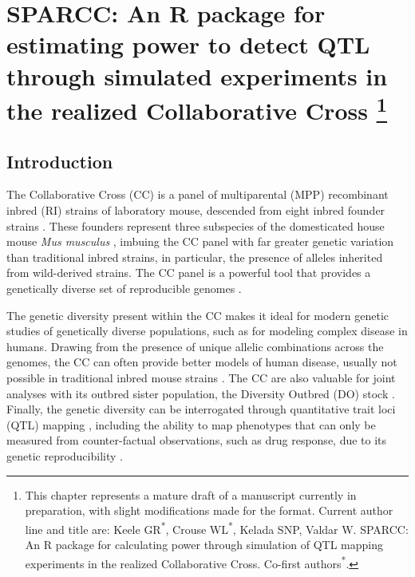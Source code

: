 \chapter[SPARCC: An R package for estimating power to detect QTL through simulated experiments in the realized Collaborative Cross]{SPARCC: An R package for estimating power to detect QTL through simulated experiments in the realized Collaborative Cross
\footnote{This chapter represents a mature draft of a manuscript currently in preparation, with slight modifications made for the format. Current author line and title are: Keele GR\textsuperscript{*}, Crouse WL\textsuperscript{*}, Kelada SNP, Valdar W. SPARCC: An R package for calculating power through simulation of QTL mapping experiments in the realized Collaborative Cross. Co-first authors\textsuperscript{*}.}}
\label{chap:sparcc}

\section{Introduction}

The Collaborative Cross (CC) is a panel of multiparental (MPP) recombinant inbred (RI) strains of laboratory mouse, descended from eight inbred founder strains \citep{Threadgill2002,Churchill2004}. These founders represent three subspecies of the domesticated house mouse \textit{Mus musculus} \citep{Yang2011}, imbuing the CC panel with far greater genetic variation than traditional inbred strains, in particular, the presence of alleles inherited from wild-derived strains. The CC panel is a powerful tool that provides a genetically diverse set of reproducible genomes \citep{Hall2012,Srivastava2017}. 

The genetic diversity present within the CC makes it ideal for modern genetic studies of genetically diverse populations, such as for modeling complex disease in humans. Drawing from the presence of unique allelic combinations across the genomes, the CC can often provide better models of human disease, usually not possible in traditional inbred mouse strains \citep{Rogala2014,Gralinski2015}. The CC are also valuable for joint analyses with its outbred sister population, the Diversity Outbred (DO) stock \citep{Churchill2012,Chick2016}. Finally, the genetic diversity can be interrogated through quantitative trait loci (QTL) mapping \citep{Aylor2011,Kelada2016,Donoghue2017,Maurizio2017}, including the ability to map phenotypes that can only be measured from counter-factual observations, such as drug response, due to its genetic reproducibility \citep{Mosedale2017}. 

